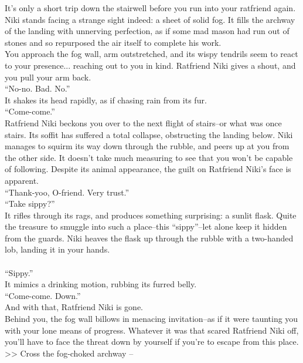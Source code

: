 It’s only a short trip down the stairwell before you run into your ratfriend again. Niki stands facing a strange sight indeed: a sheet of solid fog. It fills the archway of the landing with unnerving perfection, as if some mad mason had run out of stones and so repurposed the air itself to complete his work.\\

You approach the fog wall, arm outstretched, and its wispy tendrils seem to react to your presence... reaching out to you in kind. Ratfriend Niki gives a shout, and you pull your arm back.\\

“No-no. Bad. No.”\\
It shakes its head rapidly, as if chasing rain from its fur.\\

“Come-come.”\\
Ratfriend Niki beckons you over to the next flight of stairs--or what was once stairs. Its soffit has suffered a total collapse, obstructing the landing below. Niki manages to squirm its way down through the rubble, and peers up at you from the other side. It doesn’t take much measuring to see that you won’t be capable of following. Despite its animal appearance, the guilt on Ratfriend Niki’s face is apparent.\\

“Thank-yoo, O-friend. Very trust.”\\

“Take sippy?”\\
It rifles through its rags, and produces something surprising: a sunlit flask. Quite the treasure to smuggle into such a place--this “sippy”--let alone keep it hidden from the guards. Niki heaves the flask up through the rubble with a two-handed lob, landing it in your hands.\\
\\

“Sippy.”\\
It mimics a drinking motion, rubbing its furred belly.\\

“Come-come. Down.”\\
And with that, Ratfriend Niki is gone.\\

Behind you, the fog wall billows in menacing invitation--as if it were taunting you with your lone means of progress. Whatever it was that scared Ratfriend Niki off, you’ll have to face the threat down by yourself if you’re to escape from this place.\\

>> Cross the fog-choked archway -- 